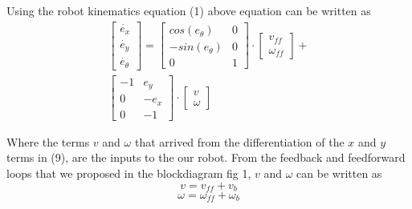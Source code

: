 \documentclass[conference]{IEEEtran}
\begin{document}
Using the robot kinematics equation (1) above equation can be written as
\begin{equation}\label{eeq}
\begin{split}
\begin{bmatrix}
\dot{e_{x}}\\ 
\dot{e_{y}}\\ 
\dot{e_{\theta}}
\end{bmatrix}
=
\begin{bmatrix}
cos(e_{\theta}) & 0\\ 
-sin(e_{\theta}) & 0\\ 
0 & 1
\end{bmatrix}
\cdot
\begin{bmatrix}
v_{ff}\\ 
\omega_{ff}
\end{bmatrix}
+\\
\begin{bmatrix}
-1 & e_{y}\\ 
0 & -e_{x}\\ 
0 & -1
\end{bmatrix}
\cdot
\begin{bmatrix}
v\\ 
\omega
\end{bmatrix}
\end{split}
\end{equation}

Where the terms $v$ and $\omega$ that arrived from the differentiation of the $x$ and $y$ terms in (9), are the inputs to the our robot. From the feedback and feedforward loops that we proposed in the blockdiagram fig 1, $v$ and $\omega$ can be written as 
\begin{equation}\label{eq}
v = v_{ff} + v_{b}
\end{equation}
\begin{equation}\label{eq}
\omega = \omega_{ff} + \omega_{b}
\end{equation}
\end{document}
